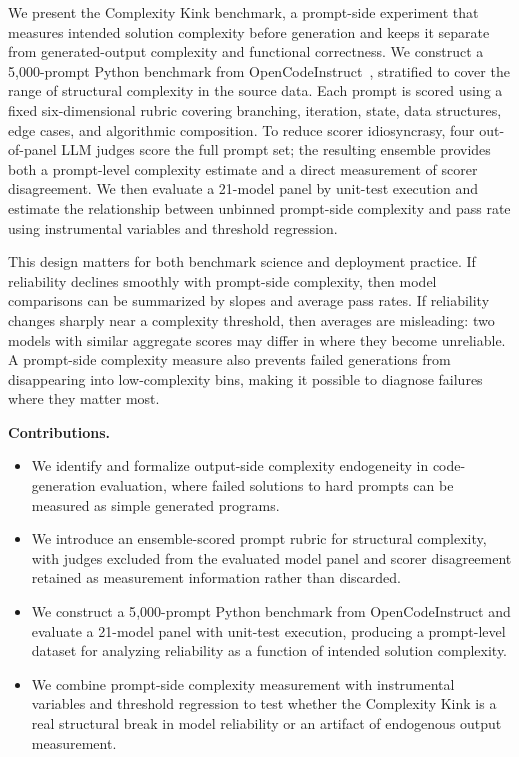 \documentclass[conference]{IEEEtran}
\begin{document}
We present the Complexity Kink benchmark, a prompt-side experiment that measures intended solution complexity before generation and keeps it separate from generated-output complexity and functional correctness. We construct a 5{,}000-prompt Python benchmark from OpenCodeInstruct~\cite{opencodeinst}, stratified to cover the range of structural complexity in the source data. Each prompt is scored using a fixed six-dimensional rubric covering branching, iteration, state, data structures, edge cases, and algorithmic composition. To reduce scorer idiosyncrasy, four out-of-panel LLM judges score the full prompt set; the resulting ensemble provides both a prompt-level complexity estimate and a direct measurement of scorer disagreement. We then evaluate a 21-model panel by unit-test execution and estimate the relationship between unbinned prompt-side complexity and pass rate using instrumental variables and threshold regression.

This design matters for both benchmark science and deployment practice. If reliability declines smoothly with prompt-side complexity, then model comparisons can be summarized by slopes and average pass rates. If reliability changes sharply near a complexity threshold, then averages are misleading: two models with similar aggregate scores may differ in where they become unreliable. A prompt-side complexity measure also prevents failed generations from disappearing into low-complexity bins, making it possible to diagnose failures where they matter most.

\vspace{2pt}
\noindent\textbf{Contributions.}
\begin{itemize}
\item We identify and formalize output-side complexity endogeneity in code-generation evaluation, where failed solutions to hard prompts can be measured as simple generated programs.
\item We introduce an ensemble-scored prompt rubric for structural complexity, with judges excluded from the evaluated model panel and scorer disagreement retained as measurement information rather than discarded.
\item We construct a 5{,}000-prompt Python benchmark from OpenCodeInstruct and evaluate a 21-model panel with unit-test execution, producing a prompt-level dataset for analyzing reliability as a function of intended solution complexity.
\item We combine prompt-side complexity measurement with instrumental variables and threshold regression to test whether the Complexity Kink is a real structural break in model reliability or an artifact of endogenous output measurement.
\end{itemize}
\end{document}
